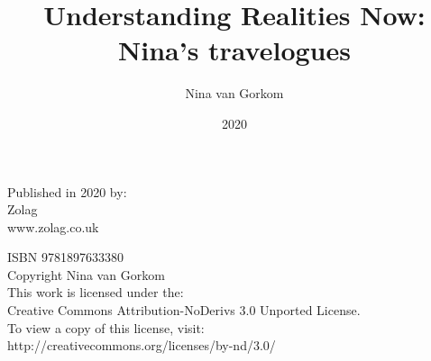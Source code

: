 \documentclass{book}
\title{Understanding Realities Now:\\ Nina’s travelogues}
\author{Nina van Gorkom}
\date{2020}
\begin{document}
\maketitle
\vspace*{10pt}
\noindent Published in 2020 by:\\
Zolag\\
www.zolag.co.uk\\
\vspace{10pt}

\noindent ISBN 9781897633380\\ 
Copyright Nina van Gorkom\\

\noindent This work is licensed under the: \\
Creative Commons Attribution-NoDerivs 3.0 Unported License.\\
To view a copy of this license, visit:\\
http://creativecommons.org/licenses/by-nd/3.0/ \\

\frontmatter
\tableofcontents

\mainmatter











%



%
%
%
%
\end{document}
